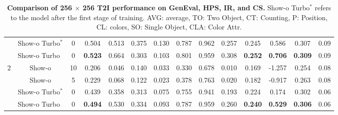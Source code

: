 \begin{table*}[t]
\begin{tabular}{ccc|ccccccc|ccc|c}
         & Show-o Turbo$^*$ & 0 & 0.504 & 0.513 & 0.375 & 0.130 & 0.787 & 0.962 & 0.257 & 0.245 & 0.586 & 0.307 & 0.09 \\
         & Show-o Turbo$\;\,$ & 0 & \textbf{0.523} & 0.664 & 0.303 & 0.103 & 0.801 & 0.959 & 0.308 & \textbf{0.252} & \textbf{0.706} & \textbf{0.309} & 0.09 \\
        \midrule
        \multirow{4}{*}{2} & Show-o & 10 & 0.206 & 0.046 & 0.140 & 0.033 & 0.330 & 0.678 & 0.010 & 0.169 & -1.257 & 0.254 & 0.08 \\
         & Show-o & 5 & 0.229 & 0.068 & 0.122 & 0.023 & 0.378 & 0.763 & 0.020 & 0.182 & -0.917 & 0.263 & 0.08 \\
         & Show-o Turbo$^*$ & 0 & 0.439 & 0.358 & 0.313 & 0.075 & 0.755 & 0.941 & 0.193 & 0.224 & 0.174 & 0.302 & 0.06 \\
         & Show-o Turbo$\;\,$ & 0 & \textbf{0.494} & 0.530 & 0.334 & 0.093 & 0.787 & 0.959 & 0.260 & \textbf{0.240} & \textbf{0.529} & \textbf{0.306} & 0.06 \\
        \bottomrule
    \end{tabular}
    \caption{\textbf{Comparison of 256 $\times$ 256 T2I performance on GenEval, HPS, IR, and CS.} 
    Show-o Turbo$^*$ refers to the model after the first stage of training. 
    AVG: average, TO: Two Object, CT: Counting, P: Position, CL: colors, SO: Single Object, CLA: Color Attr. }
    \label{tab:old_merged_method_comparison}
\end{table*}


